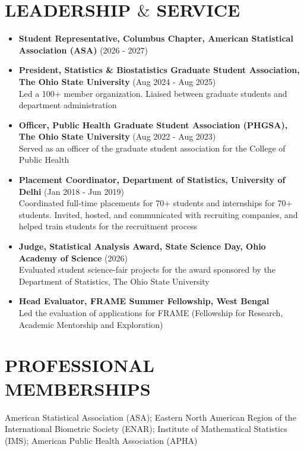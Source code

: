 \documentclass[11pt,a4paper,roman]{moderncv}        %
\begin{document}
\section{LEADERSHIP $\&$ SERVICE}
\begin{itemize}
\item \textbf{Student Representative, Columbus Chapter, American Statistical Association (ASA)} (2026 - 2027)
\item \textbf{President, Statistics \& Biostatistics Graduate Student Association, The Ohio State University} (Aug 2024 - Aug 2025)\\
Led a 100+ member organization. Liaised between graduate students and department administration
\item \textbf{Officer, Public Health Graduate Student Association (PHGSA), The Ohio State University} (Aug 2022 - Aug 2023)\\
Served as an officer of the graduate student association for the College of Public Health
\item \textbf{Placement Coordinator, Department of Statistics, University of Delhi} (Jan 2018 - Jun 2019)\\
Coordinated full-time placements for 70+ students and internships for 70+ students. Invited, hosted, and communicated with recruiting companies, and helped train students for the recruitment process
\vskip 0.1cm
\item \textbf{Judge, Statistical Analysis Award, State Science Day, Ohio Academy of Science} (2026)\\
Evaluated student science-fair projects for the award sponsored by the Department of Statistics, The Ohio State University
\vskip 0.1cm
\item \textbf{Head Evaluator, FRAME Summer Fellowship, West Bengal}\\
Led the evaluation of applications for FRAME (Fellowship for Research, Academic Mentorship and Exploration)
 \end{itemize}

\section{PROFESSIONAL MEMBERSHIPS}
American Statistical Association (ASA); Eastern North American Region of the International Biometric Society (ENAR); Institute of Mathematical Statistics (IMS); American Public Health Association (APHA)
\end{document}
